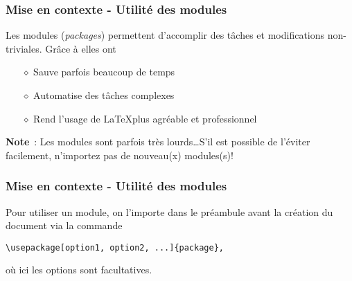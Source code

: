 
\begin{frame}
    \frametitle{Mise en contexte - Utilité des modules}
    Les modules (\textit{packages}) permettent d'accomplir
    des tâches et modifications non-triviales. Grâce à elles ont
    \vspace{0.3cm}
    \begin{itemize}
        \pause
        \item[$\diamond$] Sauve parfois beaucoup de temps
        \item[$\diamond$] Automatise des tâches complexes
        \item[$\diamond$] Rend l'usage de \LaTeX\;plus agréable et professionnel
    \end{itemize}
    \vfill
    \pause
    \begin{mybrownbox}
        \textbf{Note}~: Les modules sont parfois très lourds\dots\;S'il est possible de l'éviter
        facilement, n'importez pas de nouveau(x) modules(s)!
    \end{mybrownbox}
\end{frame}

\begin{frame}[fragile]
    \frametitle{Mise en contexte - Utilité des modules}
    Pour utiliser un module, on l'importe dans le préambule \textcolor{vibrant_green}{avant la création du
    document} via la commande
    \vfill
    \begin{lstlisting}[xleftmargin=-10mm]
        \usepackage[option1, option2, ...]{package},
    \end{lstlisting}
    \vfill
    où ici les options sont facultatives.
\end{frame}
